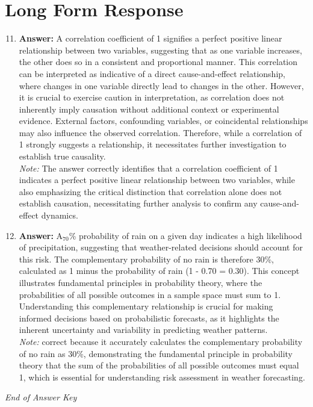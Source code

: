 \documentclass[12pt]{article}
\begin{document}
\section*{Long Form Response}
\begin{enumerate}[label=\arabic*.]
\setcounter{enumi}{10}
\item \textbf{Answer:} A correlation coefficient of 1 signifies a perfect positive linear relationship between two variables, suggesting that as one variable increases, the other does so in a consistent and proportional manner. This correlation can be interpreted as indicative of a direct cause-and-effect relationship, where changes in one variable directly lead to changes in the other. However, it is crucial to exercise caution in interpretation, as correlation does not inherently imply causation without additional context or experimental evidence. External factors, confounding variables, or coincidental relationships may also influence the observed correlation. Therefore, while a correlation of 1 strongly suggests a relationship, it necessitates further investigation to establish true causality.
\\ \textit{Note:} The answer correctly identifies that a correlation coefficient of 1 indicates a perfect positive linear relationship between two variables, while also emphasizing the critical distinction that correlation alone does not establish causation, necessitating further analysis to confirm any cause-and-effect dynamics.
\item \textbf{Answer:} A$_{70}$\% probability of rain on a given day indicates a high likelihood of precipitation, suggesting that weather-related decisions should account for this risk. The complementary probability of no rain is therefore 30\%, calculated as 1 minus the probability of rain (1 - 0.70 = 0.30). This concept illustrates fundamental principles in probability theory, where the probabilities of all possible outcomes in a sample space must sum to 1. Understanding this complementary relationship is crucial for making informed decisions based on probabilistic forecasts, as it highlights the inherent uncertainty and variability in predicting weather patterns.
\\ \textit{Note:} correct because it accurately calculates the complementary probability of no rain as 30\%, demonstrating the fundamental principle in probability theory that the sum of the probabilities of all possible outcomes must equal 1, which is essential for understanding risk assessment in weather forecasting.
\end{enumerate}

\vfill
\noindent\textit{End of Answer Key}
\end{document}
